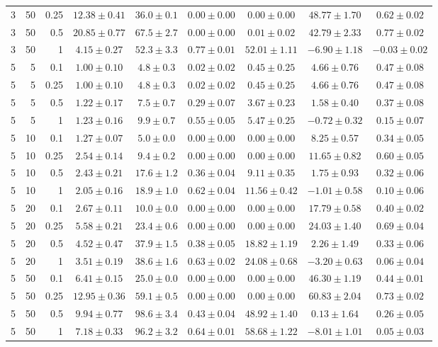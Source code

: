 \begin{table}[htbp]
\begin{tabular}{@{}rrrcccccc@{}}
3 & 50 & 0.25 & $12.38 \pm 0.41$ & $36.0 \pm 0.1$ & $0.00 \pm 0.00$ & $0.00 \pm 0.00$ & $48.77 \pm 1.70$ & $0.62 \pm 0.02$ \\
3 & 50 & 0.5 & $20.85 \pm 0.77$ & $67.5 \pm 2.7$ & $0.00 \pm 0.00$ & $0.01 \pm 0.02$ & $42.79 \pm 2.33$ & $0.77 \pm 0.02$ \\
3 & 50 & 1 & $4.15 \pm 0.27$ & $52.3 \pm 3.3$ & $0.77 \pm 0.01$ & $52.01 \pm 1.11$ & $-6.90 \pm 1.18$ & $-0.03 \pm 0.02$ \\
\midrule
5 & 5 & 0.1 & $1.00 \pm 0.10$ & $4.8 \pm 0.3$ & $0.02 \pm 0.02$ & $0.45 \pm 0.25$ & $4.66 \pm 0.76$ & $0.47 \pm 0.08$ \\
5 & 5 & 0.25 & $1.00 \pm 0.10$ & $4.8 \pm 0.3$ & $0.02 \pm 0.02$ & $0.45 \pm 0.25$ & $4.66 \pm 0.76$ & $0.47 \pm 0.08$ \\
5 & 5 & 0.5 & $1.22 \pm 0.17$ & $7.5 \pm 0.7$ & $0.29 \pm 0.07$ & $3.67 \pm 0.23$ & $1.58 \pm 0.40$ & $0.37 \pm 0.08$ \\
5 & 5 & 1 & $1.23 \pm 0.16$ & $9.9 \pm 0.7$ & $0.55 \pm 0.05$ & $5.47 \pm 0.25$ & $-0.72 \pm 0.32$ & $0.15 \pm 0.07$ \\
5 & 10 & 0.1 & $1.27 \pm 0.07$ & $5.0 \pm 0.0$ & $0.00 \pm 0.00$ & $0.00 \pm 0.00$ & $8.25 \pm 0.57$ & $0.34 \pm 0.05$ \\
5 & 10 & 0.25 & $2.54 \pm 0.14$ & $9.4 \pm 0.2$ & $0.00 \pm 0.00$ & $0.00 \pm 0.00$ & $11.65 \pm 0.82$ & $0.60 \pm 0.05$ \\
5 & 10 & 0.5 & $2.43 \pm 0.21$ & $17.6 \pm 1.2$ & $0.36 \pm 0.04$ & $9.11 \pm 0.35$ & $1.75 \pm 0.93$ & $0.32 \pm 0.06$ \\
5 & 10 & 1 & $2.05 \pm 0.16$ & $18.9 \pm 1.0$ & $0.62 \pm 0.04$ & $11.56 \pm 0.42$ & $-1.01 \pm 0.58$ & $0.10 \pm 0.06$ \\
5 & 20 & 0.1 & $2.67 \pm 0.11$ & $10.0 \pm 0.0$ & $0.00 \pm 0.00$ & $0.00 \pm 0.00$ & $17.79 \pm 0.58$ & $0.40 \pm 0.02$ \\
5 & 20 & 0.25 & $5.58 \pm 0.21$ & $23.4 \pm 0.6$ & $0.00 \pm 0.00$ & $0.00 \pm 0.00$ & $24.03 \pm 1.40$ & $0.69 \pm 0.04$ \\
5 & 20 & 0.5 & $4.52 \pm 0.47$ & $37.9 \pm 1.5$ & $0.38 \pm 0.05$ & $18.82 \pm 1.19$ & $2.26 \pm 1.49$ & $0.33 \pm 0.06$ \\
5 & 20 & 1 & $3.51 \pm 0.19$ & $38.6 \pm 1.6$ & $0.63 \pm 0.02$ & $24.08 \pm 0.68$ & $-3.20 \pm 0.63$ & $0.06 \pm 0.04$ \\
5 & 50 & 0.1 & $6.41 \pm 0.15$ & $25.0 \pm 0.0$ & $0.00 \pm 0.00$ & $0.00 \pm 0.00$ & $46.30 \pm 1.19$ & $0.44 \pm 0.01$ \\
5 & 50 & 0.25 & $12.95 \pm 0.36$ & $59.1 \pm 0.5$ & $0.00 \pm 0.00$ & $0.00 \pm 0.00$ & $60.83 \pm 2.04$ & $0.73 \pm 0.02$ \\
5 & 50 & 0.5 & $9.94 \pm 0.77$ & $98.6 \pm 3.4$ & $0.43 \pm 0.04$ & $48.92 \pm 1.40$ & $0.13 \pm 1.64$ & $0.26 \pm 0.05$ \\
5 & 50 & 1 & $7.18 \pm 0.33$ & $96.2 \pm 3.2$ & $0.64 \pm 0.01$ & $58.68 \pm 1.22$ & $-8.01 \pm 1.01$ & $0.05 \pm 0.03$ \\
\bottomrule
\end{tabular}
\end{table}
